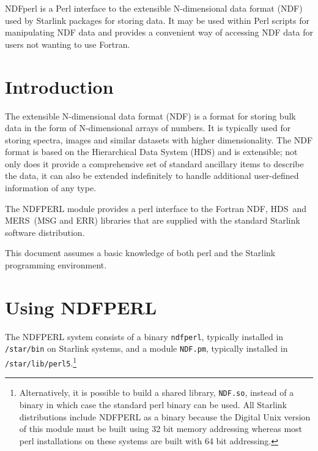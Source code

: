 \documentclass[twoside,11pt]{article}
\newcommand{\stardocinitials}  {SUN}
\newcommand{\stardocnumber}    {222.1}
\newcommand{\stardocabstract}  {NDFperl is a Perl interface to the extensible
N-dimensional data format (NDF) used by Starlink packages for storing data.
It may be used within Perl scripts for manipulating NDF data and provides a
convenient way of accessing NDF data for users not wanting to use Fortran.}
\newcommand{\stardocname}{\stardocinitials /\stardocnumber}
\newenvironment{latexonly}{}{}
\newcommand{\xref}[3]{#1}
\newcommand{\xlabel}[1]{}
\newcommand{\latexonlytoc}[0]{\tableofcontents}
\newcommand{\ndf}{\xref{NDF}{sun33}{}}
\newcommand{\hds}{\xref{HDS}{sun92}{}}
\newcommand{\mers}{\xref{MERS}{sun104}{}}
\renewcommand{\thepage}{\roman{page}}
\begin{document}
  \stardocabstract
  \newpage
  \begin{latexonly}
    \setlength{\parskip}{0mm}
    \latexonlytoc
    \setlength{\parskip}{\medskipamount}
    \markboth{\stardocname}{\stardocname}
  \end{latexonly}
  \cleardoublepage
  \renewcommand{\thepage}{\arabic{page}}
  \setcounter{page}{1}

\section{\xlabel{introduction}\label{introduction}Introduction}

The extensible N-dimensional data format (NDF) is a format for storing bulk
data in the form of N-dimensional arrays of numbers.  It is typically used
for storing spectra, images and similar datasets with higher dimensionality.
The NDF format is based on the Hierarchical Data System (HDS) and is
extensible; not only does it provide a comprehensive set of standard
ancillary items to describe the data, it can also be extended indefinitely
to handle additional user-defined information of any type.

The NDFPERL module provides a perl interface to the Fortran \ndf, \hds\ and
\mers\ (MSG and ERR) libraries that are supplied with the standard Starlink
software distribution.

This document assumes a basic knowledge of both perl and the Starlink
programming environment.


\section{\xlabel{using_ndfperl}\label{using_ndfperl}Using NDFPERL}

The NDFPERL system consists of a binary \texttt{ndfperl}, typically
installed in \texttt{/star/bin} on Starlink systems, and a module
\texttt{NDF.pm}, typically installed in
\texttt{/star/lib/perl5}.\footnote{Alternatively, it is possible to
build a shared library, \texttt{NDF.so}, instead of a binary in which
case the standard perl binary can be used.  All Starlink distributions
include NDFPERL as a binary because the Digital Unix version of this
module must be built using 32 bit memory addressing whereas most perl
installations on these systems are built with 64 bit addressing.}
\end{document}
